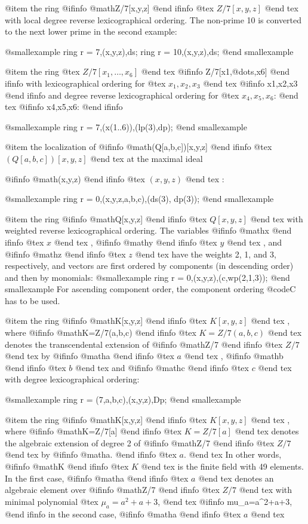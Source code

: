 @item
the ring 
@ifinfo
@math{Z/7[x,y,z]}
@end ifinfo
@tex
$Z/7[x,y,z]$
@end tex
 with local degree reverse lexicographical
ordering.  The non-prime 10 is converted to the next lower prime in the
second example:

@smallexample
ring r = 7,(x,y,z),ds;
ring r = 10,(x,y,z),ds;
@end smallexample

@item
the ring
@tex
$Z/7[x_1,\ldots,x_6]$
@end tex
@ifinfo
Z/7[x1,@dots{},x6]
@end ifinfo
with lexicographical ordering for
@tex
$x_1,x_2,x_3$
@end tex
@ifinfo
x1,x2,x3
@end ifinfo
and degree reverse lexicographical ordering for
@tex
$x_4,x_5,x_6$:
@end tex
@ifinfo
x4,x5,x6:
@end ifinfo

@smallexample
ring r = 7,(x(1..6)),(lp(3),dp);
@end smallexample

@item
the localization of 
@ifinfo
@math{(Q[a,b,c])[x,y,z]}
@end ifinfo
@tex
$(Q[a,b,c])[x,y,z]$
@end tex
 at the maximal ideal

@ifinfo
@math{(x,y,z)}
@end ifinfo
@tex
$(x,y,z)$
@end tex
:

@smallexample
ring r = 0,(x,y,z,a,b,c),(ds(3), dp(3));
@end smallexample

@item
the ring 
@ifinfo
@math{Q[x,y,z]}
@end ifinfo
@tex
$Q[x,y,z]$
@end tex
 with weighted reverse lexicographical ordering.
The variables 
@ifinfo
@math{x}
@end ifinfo
@tex
$x$
@end tex
, 
@ifinfo
@math{y}
@end ifinfo
@tex
$y$
@end tex
, and 
@ifinfo
@math{z}
@end ifinfo
@tex
$z$
@end tex
 have the weights 2, 1,
and 3, respectively, and  vectors are first ordered by components (in
descending order) and then by monomials:
@smallexample
ring r = 0,(x,y,z),(c,wp(2,1,3));
@end smallexample
For ascending component order, the component ordering @code{C} has to be
used.

@item
the ring 
@ifinfo
@math{K[x,y,z]}
@end ifinfo
@tex
$K[x,y,z]$
@end tex
, where 
@ifinfo
@math{K=Z/7(a,b,c)}
@end ifinfo
@tex
$K=Z/7(a,b,c)$
@end tex
 denotes the transcendental
extension of 
@ifinfo
@math{Z/7}
@end ifinfo
@tex
$Z/7$
@end tex
 by 
@ifinfo
@math{a}
@end ifinfo
@tex
$a$
@end tex
, 
@ifinfo
@math{b}
@end ifinfo
@tex
$b$
@end tex
 and 
@ifinfo
@math{c}
@end ifinfo
@tex
$c$
@end tex
 with degree
lexicographical ordering:

@smallexample
ring r = (7,a,b,c),(x,y,z),Dp;
@end smallexample

@item
the ring 
@ifinfo
@math{K[x,y,z]}
@end ifinfo
@tex
$K[x,y,z]$
@end tex
, where 
@ifinfo
@math{K=Z/7[a]}
@end ifinfo
@tex
$K=Z/7[a]$
@end tex
 denotes the algebraic extension of
degree 2 of 
@ifinfo
@math{Z/7}
@end ifinfo
@tex
$Z/7$
@end tex
 by 
@ifinfo
@math{a.}
@end ifinfo
@tex
$a.$
@end tex
 In other words, 
@ifinfo
@math{K}
@end ifinfo
@tex
$K$
@end tex
 is the finite field with
49 elements.  In the first case, 
@ifinfo
@math{a}
@end ifinfo
@tex
$a$
@end tex
 denotes an algebraic
element over 
@ifinfo
@math{Z/7}
@end ifinfo
@tex
$Z/7$
@end tex
 with minimal polynomial
@tex
$\mu_a=a^2+a+3$,
@end tex
@ifinfo
mu_a=a^2+a+3,
@end ifinfo
in the second case, 
@ifinfo
@math{a}
@end ifinfo
@tex
$a$
@end tex

